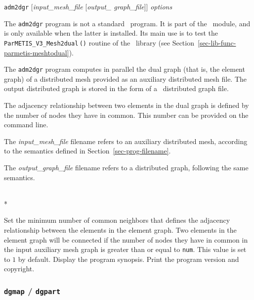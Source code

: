 \begin{itemize}
\progsyn
{\tt adm2dgr} [{\it input\_\lbt mesh\_\lbt file} [{\it output\_\lbt
graph\_\lbt file}]] {\it options}

\progdes

The \texttt{adm2dgr} program is not a standard \scotch\ program. It is
part of the \libscotchmetis\ module, and is only available when the
latter is installed. Its main use is to test the
\texttt{ParMETIS\_\lbt V3\_\lbt Mesh2dual$\,$()} routine of the
\libscotchmetis\ library (see
Section~\ref{sec-lib-func-parmetis-meshtodual}).

The \texttt{adm2dgr} program computes in parallel the dual graph (that
is, the element graph) of a distributed mesh provided as an auxiliary
distributed mesh file. The output distributed graph is stored in the
form of a \scotch\ distributed graph file.

The adjacency relationship between two elements in the dual graph is
defined by the number of nodes they have in common. This number can be
provided on the command line.

The \textit{input\_mesh\_file} filename refers to an auxiliary
distributed mesh, according to the semantics defined in
Section~\ref{sec-prog-filename}.

The {\it output\_graph\_file} filename refers to a distributed graph,
following the same semantics.

\progopt\\*
\begin{itemize}
Set the minimum number of common neighbors that defines the adjacency
relationship between the elements in the element graph. Two elements
in the element graph will be connected if the number of nodes they
have in common in the input auxiliary mesh graph is greater than or
equal to \texttt{num}. This value is set to $1$ by default.
\iteme[{\tt -h}]
Display the program synopsis.
\iteme[{\tt -V}]
Print the program version and copyright.
\end{itemize}
\end{itemize}

\subsubsection{{\tt dgmap} / {\tt dgpart}}
\label{sec-prog-dgmap}

